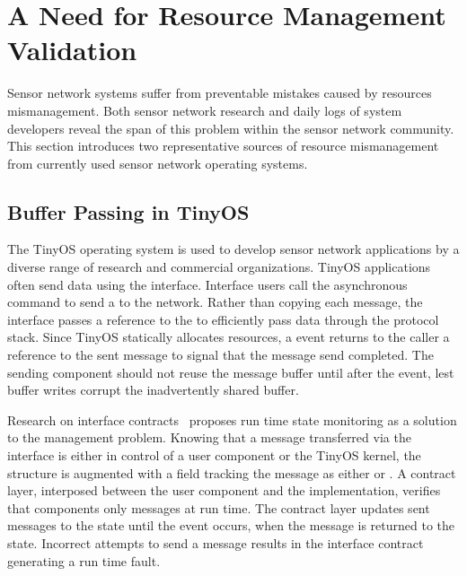 \section{A Need for Resource Management Validation}
\label{sec:mot}

Sensor network systems suffer from preventable mistakes caused by resources
mismanagement.
%
Both sensor network research and daily logs of system developers reveal the
span of this problem within the sensor network community.
%
This section introduces two representative sources of resource mismanagement
from currently used sensor network operating systems.



\subsection{Buffer Passing in TinyOS}
\label{ssec:tinyos}


The TinyOS operating system is used to develop sensor network applications by
a diverse range of research and commercial organizations.
%
TinyOS applications often send data using the  interface.
%
Interface users call the asynchronous  command to send a
 to the network.
%
Rather than copying each message, the  interface passes a
reference to the  to efficiently pass data through the protocol
stack.
%
Since TinyOS statically allocates resources, a  event returns
to the caller a reference to the sent message to signal that the message send
completed.
%
The sending component should not reuse the message buffer until after the
 event, lest buffer writes corrupt the inadvertently shared
buffer.



Research on interface contracts~\cite{archer07interface} proposes run time
state monitoring as a solution to the management problem.
%
Knowing that a message transferred via the  interface is
either in control of a user component or the TinyOS kernel, the
 structure is augmented with a  field
tracking the message as either  or .
%
A contract layer, interposed between the user component and the
 implementation, verifies that components only 
 messages at run time.
%
The contract layer updates sent messages to the  state until
the  event occurs, when the message is returned to the
 state.
%
Incorrect attempts to send a  message results in the
interface contract generating a run time fault.



